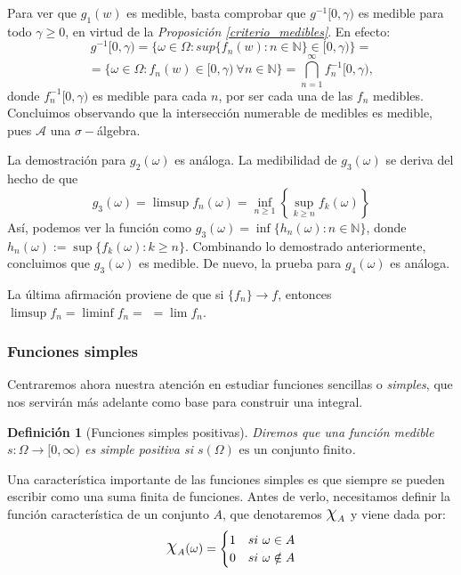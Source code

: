 \documentclass[11pt, a4paper]{article}
\makeatletter
\newif\IfInSansMode
\let\oldsf\sffamily
\renewcommand*{\sffamily}{\oldsf\mathversion{sans}\InSansModetrue}
\let\oldnorm\normalfont
\renewcommand*{\normalfont}{\oldnorm\InSansModefalse\mathversion{normal}}
\newcommand{\fn}{\{f_n\}}
\DeclareRobustCommand{\rchi}{{\Large \mathpalette\irchi\relax}}
\newcommand{\irchi}[2]{\raisebox{0.4\depth}{$#1\chi$}} %
\renewenvironment{proof}[1][\proofname] {\par\pushQED{\qed}\normalfont\topsep6\p@\@plus6\p@\relax\trivlist\item[\hskip\labelsep\itshape\sffamily#1\@addpunct{.}]\ignorespaces}{\popQED\endtrivlist\@endpefalse}
\theoremstyle{theorem-style}
\theoremstyle{definition-style}
\newtheorem{ndef}{Definición}[section]
\theoremstyle{remark-style}
\theoremstyle{example-style}
\makeatother
\begin{document}
  \begin{proof}
	Para ver que $g_1(w)$ es medible, basta comprobar que $g^{-1}[0,\gamma)$ es medible para todo $\gamma \ge 0$, en virtud de la \textit{Proposición \ref{criterio_medibles}}. En efecto: $$g^{-1}[0,\gamma) = \{\omega \in \Omega : sup\{f_n(w) : n \in \mathbb{N}\} \in [0,\gamma)\} =$$  $$ = \{ \omega \in \Omega : f_n(w) \in [0,\gamma) \ \forall n \in \mathbb{N}\} = \bigcap_{n=1}^{\infty} f_n^{-1}[0,\gamma), $$ donde $f_n^{-1}[0,\gamma)$ es medible para cada $n$, por ser cada una de las $f_n$ medibles. Concluimos observando que la intersección numerable de medibles es medible, pues $\mathscr A$ una $\sigma-$álgebra.
	
	La demostración para $g_2(\omega)$ es análoga. La medibilidad de $g_3(\omega)$ se deriva del hecho de que $$g_3(\omega) = \limsup f_n(\omega) = \inf_{n \ge 1} \left\{\sup_{k\ge n} f_k(\omega) \right\}$$ Así, podemos ver la función como $g_3(\omega) = \inf \{h_n(\omega) : n \in \mathbb{N}\}$, donde $h_n(\omega) := \sup \{f_k(\omega) : k \ge n\}$. Combinando lo demostrado anteriormente, concluimos que $g_3(\omega)$ es medible. De nuevo, la prueba para $g_4(\omega)$ es análoga.
	
La última afirmación proviene de que si $\fn \to f$, entonces $\limsup f_n = \liminf f_n =$ $=\lim f_n$.
\end{proof}



\subsubsection*{Funciones simples}

Centraremos ahora nuestra atención en estudiar funciones sencillas o \textit{simples}, que nos servirán más adelante como base para construir una integral.

\begin{ndef}[Funciones simples positivas]
  Diremos que una función medible $s: \Omega \to [0,\infty)$ es simple positiva si 
  $s(\Omega) \text{ es un conjunto finito}$.
\end{ndef}

Una característica importante de las funciones simples es que siempre se pueden escribir como una suma finita de funciones. Antes de verlo, necesitamos definir la función característica de un conjunto $A$, que denotaremos $\rchi_A$ y viene dada por:
\[
  \rchi_A(\omega)= \begin{cases}
    1 & si \ \omega \in A\\
    0 & si \ \omega \notin A
  \end{cases}
\]
\end{document}
